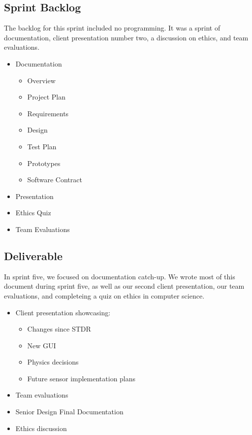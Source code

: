 \subsection{Sprint Backlog}

The backlog for this sprint included no programming. It was a sprint of documentation, client presentation number two, a discussion on ethics, and team evaluations.

\begin{itemize}
	\item Documentation
	\begin{itemize}
		\item Overview
		\item Project Plan
		\item Requirements
		\item Design
		\item Test Plan
		\item Prototypes
		\item Software Contract	
	\end{itemize}
	\item Presentation
	\item Ethics Quiz
	\item Team Evaluations
\end{itemize}

\subsection{Deliverable}

In sprint five, we focused on documentation catch-up. We wrote most of this document during sprint five, as well as our second client presentation, our team evaluations, and completeing a quiz on ethics in computer science.

\begin{itemize}
	\item Client presentation showcasing:
	\begin{itemize}
		\item Changes since STDR
		\item New GUI
		\item Physics decisions
		\item Future sensor implementation plans
	\end{itemize}
	\item Team evaluations
	\item Senior Design Final Documentation
	\item Ethics discussion
\end{itemize}

